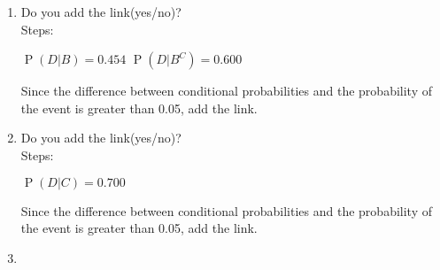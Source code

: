 \documentclass[english]{article}
\begin{document}
\begin{enumerate}
    \item Do you add the link(yes/no)?
	\\ Steps: 
    
    $\operatorname{P}(D | B) = 0.454 $\newline
    $\operatorname{P}(D | B^C) = 0.600 $
        
    Since the difference between conditional probabilities and the probability of the event is greater than 0.05, add the link.
    
    \item Do you add the link(yes/no)?
	\\ Steps: 
    
    $\operatorname{P}(D | C) = 0.700$ 
        
    Since the difference between conditional probabilities and the probability of the event is greater than 0.05, add the link.
    
    \item 
\end{enumerate}
\end{document}
